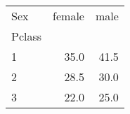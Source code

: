 \begin{tabular}{lrr}
\toprule
Sex &  female &  male \\
Pclass &         &       \\
\midrule
1      &    35.0 &  41.5 \\
2      &    28.5 &  30.0 \\
3      &    22.0 &  25.0 \\
\bottomrule
\end{tabular}
